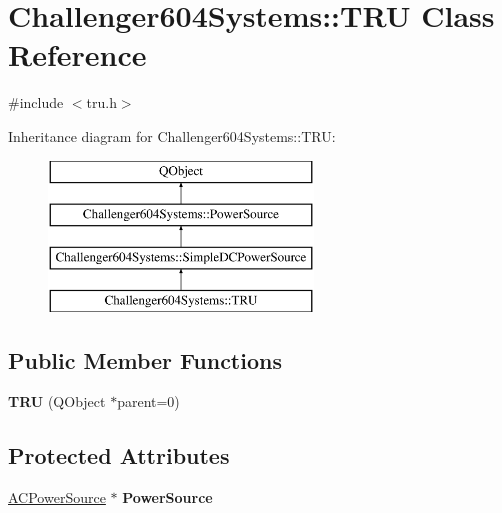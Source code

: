 \hypertarget{class_challenger604_systems_1_1_t_r_u}{\section{Challenger604\-Systems\-:\-:T\-R\-U Class Reference}
\label{class_challenger604_systems_1_1_t_r_u}
}


{\ttfamily \#include $<$tru.\-h$>$}

Inheritance diagram for Challenger604\-Systems\-:\-:T\-R\-U\-:\begin{figure}[H]
\begin{center}
\leavevmode
\includegraphics[height=4.000000cm]{class_challenger604_systems_1_1_t_r_u}
\end{center}
\end{figure}
\subsection*{Public Member Functions}
\begin{DoxyCompactItemize}
\item 
\hypertarget{class_challenger604_systems_1_1_t_r_u_a014a3e2230e963365e024eef8656ce5a}{{\bfseries T\-R\-U} (Q\-Object $\ast$parent=0)}\label{class_challenger604_systems_1_1_t_r_u_a014a3e2230e963365e024eef8656ce5a}

\end{DoxyCompactItemize}
\subsection*{Protected Attributes}
\begin{DoxyCompactItemize}
\item 
\hypertarget{class_challenger604_systems_1_1_t_r_u_a608d302cc2d994b1baa909016a602f70}{\hyperlink{class_challenger604_systems_1_1_a_c_power_source}{A\-C\-Power\-Source} $\ast$ {\bfseries Power\-Source}}\label{class_challenger604_systems_1_1_t_r_u_a608d302cc2d994b1baa909016a602f70}

\end{DoxyCompactItemize}
